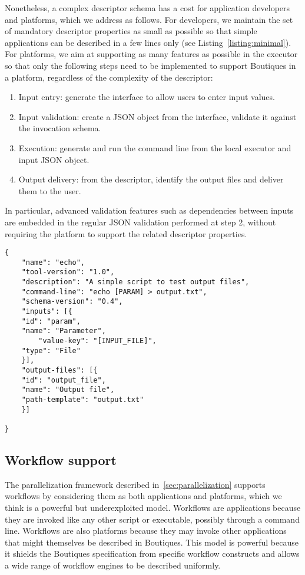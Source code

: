 \documentclass{article}
\newcommand{\boutiques}{Boutiques\xspace}
\begin{document}
Nonetheless, a complex descriptor schema has a cost for application
developers and platforms, which we address as follows. For developers,
we maintain the set of mandatory descriptor properties as small as
possible so that simple applications can be described in a few lines
only (see Listing~\ref{listing:minimal}). For platforms, we aim at
supporting as many features as possible in the executor so that
only the following steps need to be implemented to support \boutiques
in a platform, regardless of the complexity of the descriptor:
\begin{enumerate}
  \item Input entry: generate the interface to allow users to enter
    input values.
  \item Input validation: create a JSON object from the interface,
    validate it against the invocation schema.
  \item Execution: generate and run the command line from the local
    executor and input JSON object.
  \item Output delivery: from the descriptor, identify the output files
    and deliver them to the user.
\end{enumerate}
In particular, advanced validation features such as dependencies
between inputs are embedded in the regular JSON validation performed
at step 2, without requiring the platform to support the related
descriptor properties.
\begin{listing}
\begin{verbatim}
{
    "name": "echo",
    "tool-version": "1.0",
    "description": "A simple script to test output files",
    "command-line": "echo [PARAM] > output.txt",
    "schema-version": "0.4",
    "inputs": [{
	"id": "param",
	"name": "Parameter",
        "value-key": "[INPUT_FILE]",
	"type": "File"
    }],
    "output-files": [{
	"id": "output_file",
	"name": "Output file",
	"path-template": "output.txt"
    }]

}
\end{verbatim}
\caption{A minimal \boutiques descriptor.} 
\label{listing:minimal}
\end{listing}

\subsection{Workflow support}

The parallelization framework described in~\ref{sec:parallelization}
supports workflows by considering them as both applications and
platforms, which we think is a powerful but underexploited
model. Workflows are applications because they are invoked like any
other script or executable, possibly through a command line. Workflows
are also platforms because they may invoke other applications that
might themselves be described in \boutiques. This model is powerful
because it shields the \boutiques specification from specific workflow
constructs and allows a wide range of workflow engines to be described
uniformly. 
\end{document}
